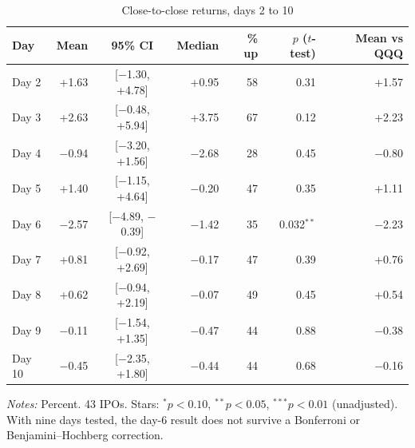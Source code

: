 \begin{table}[!htbp]\centering\small
\caption{Close-to-close returns, days 2 to 10}\label{tab:daily}

\begin{threeparttable}
\begin{tabular}{lrcrrrr}
\toprule
Day & Mean & 95\% CI & Median & \% up & $p$ ($t$-test) & Mean vs QQQ \\
\midrule
Day 2 & +1.63 & [$-$1.30, +4.78] & +0.95 & 58 & 0.31 & +1.57 \\
Day 3 & +2.63 & [$-$0.48, +5.94] & +3.75 & 67 & 0.12 & +2.23 \\
Day 4 & $-$0.94 & [$-$3.20, +1.56] & $-$2.68 & 28 & 0.45 & $-$0.80 \\
Day 5 & +1.40 & [$-$1.15, +4.64] & $-$0.20 & 47 & 0.35 & +1.11 \\
Day 6 & $-$2.57 & [$-$4.89, $-$0.39] & $-$1.42 & 35 & 0.032$^{**}$ & $-$2.23 \\
Day 7 & +0.81 & [$-$0.92, +2.69] & $-$0.17 & 47 & 0.39 & +0.76 \\
Day 8 & +0.62 & [$-$0.94, +2.19] & $-$0.07 & 49 & 0.45 & +0.54 \\
Day 9 & $-$0.11 & [$-$1.54, +1.35] & $-$0.47 & 44 & 0.88 & $-$0.38 \\
Day 10 & $-$0.45 & [$-$2.35, +1.80] & $-$0.44 & 44 & 0.68 & $-$0.16 \\
\bottomrule
\end{tabular}
\begin{tablenotes}[flushleft]\footnotesize
\item \textit{Notes:} Percent. 43 IPOs. Stars: $^{*}p<0.10$, $^{**}p<0.05$, $^{***}p<0.01$ (unadjusted). With nine days tested, the day-6 result does not survive a Bonferroni or Benjamini--Hochberg correction.
\end{tablenotes}
\end{threeparttable}

\end{table}
